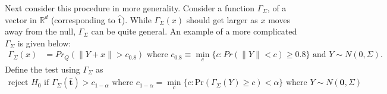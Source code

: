 \documentclass{article}
\newcommand{\disto}{P}
\newcommand{\tst}{\hat{\boldsymbol{t}}}
\newcommand{\rvt}{Y}
\newcommand{\rvv}{Z}
\newcommand{\distv}{Q}
\newcommand{\Gammaf}{\Gamma_{\Sigma}}
\begin{document}
Next consider this procedure in more generality. 
Consider a function $\Gammaf$, of a vector in $\mathbb{R}^d$ (corresponding to $\tst$). While $\Gammaf(x)$ should get larger as $x$ moves away from the null, $\Gammaf$ can be quite general.
An example of a more complicated $\Gammaf$ is given below:
\begin{align}
	\Gammaf(x) &= Pr_\distv(\|\rvt + x\| > c_{0.8})  \text{ where }  c_{0.8} \equiv \min_{c}\{c : Pr(\|\rvt\| < c) \geq 0.8 \} \text{ and } \rvt \sim N(0, \Sigma). \label{gamma:pow}
\end{align}
Define the test using $\Gammaf$ as 
\begin{align*}
	\text{reject } H_0 \text{ if } \Gammaf(\tst) > c_{1 - \alpha} \text { where } c_{1 - \alpha} = \min_{c}\{c : \text{Pr}(\Gammaf(Y) \geq c) < \alpha\} \text{ where } Y \sim N(\boldsymbol{0}, \Sigma)
\end{align*}
\end{document}
